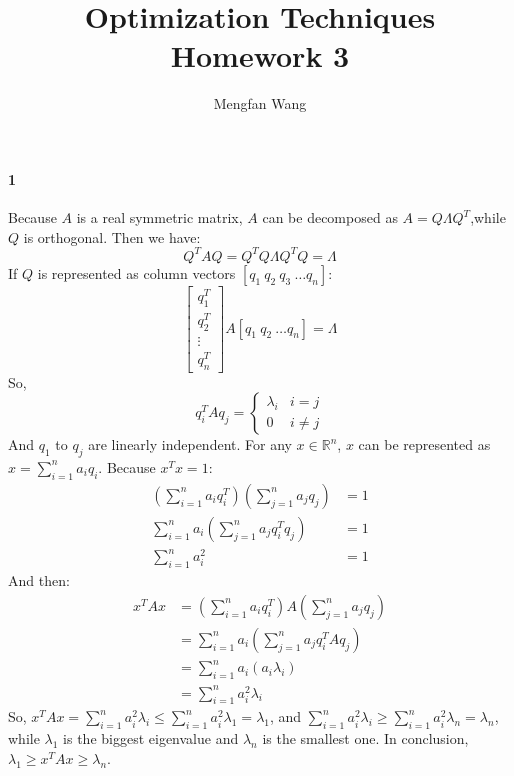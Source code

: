 \documentclass[22pt]{article}
\author{Mengfan Wang}
\title{Optimization Techniques Homework 3}
\begin{document}
	\maketitle 
	\paragraph{1}
	Because $A$ is a real symmetric matrix, $A$ can be decomposed as $A = Q\Lambda Q^T$,while $Q$ is orthogonal. Then we have:
	\begin{equation}
		Q^TAQ = Q^TQ\Lambda Q^TQ = \Lambda
	\end{equation}
	If $Q$ is represented as column vectors $[q_1\ q_2\ q_3\ \dots q_n]$:
	\begin{equation}
		\left[ \begin{array}{c} q_1^T \\ q_2^T \\ \vdots\\ q_n^T \end{array} \right] A [q_1\ q_2\ \dots q_n] = \Lambda
	\end{equation}
	So, 
	\begin{equation}
		q_i^TAq_j = \begin{cases}
			\lambda_i& i=j\\
			0& i\not=j
			\end{cases}
	\end{equation}
	And $q_1$ to $q_j$ are linearly independent. For any $x\in \mathbb{R}^n$, $x$ can be represented as $x = \sum\limits_{i=1}^na_iq_i$. Because $x^Tx = 1$:
	\begin{align}
		(\sum\limits_{i=1}^na_iq_i^T)(\sum\limits_{j=1}^na_jq_j) & = 1\\
		\sum\limits_{i=1}^na_i(\sum\limits_{j=1}^na_jq_i^Tq_j) & = 1\\
		\sum\limits_{i=1}^na_i^2 & = 1
	\end{align}
	And then:
	\begin{align}
		x^TAx & = (\sum\limits_{i=1}^na_iq_i^T)A(\sum\limits_{j=1}^na_jq_j)\\
		& = \sum\limits_{i=1}^na_i(\sum\limits_{j=1}^na_jq_i^TAq_j)\\
		& = \sum\limits_{i=1}^na_i(a_i \lambda_i)\\
		& = \sum\limits_{i=1}^na_i^2 \lambda_i
	\end{align}
	So, $x^TAx = \sum\limits_{i=1}^na_i^2 \lambda_i \leq \sum\limits_{i=1}^na_i^2 \lambda_1  = \lambda_1$, and $\sum\limits_{i=1}^na_i^2 \lambda_i \geq \sum\limits_{i=1}^na_i^2 \lambda_n = \lambda_n$, while $\lambda_1$ is the biggest eigenvalue and $\lambda_n$ is the smallest one. In conclusion, $\lambda_1\geq x^TAx \geq \lambda_n$.
\end{document}
